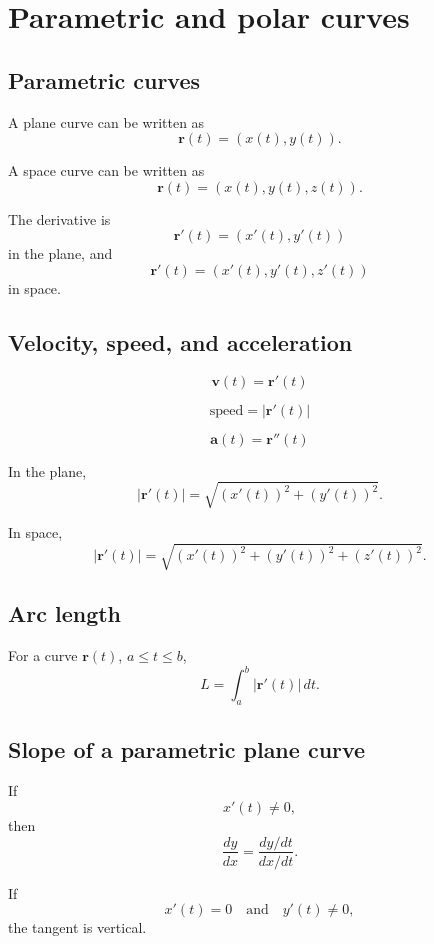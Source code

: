 \section{Parametric and polar curves}
\label{app:A.5}

\subsection*{Parametric curves}

A plane curve can be written as
\[
\boxed{
    \mathbf r(t)=(x(t),y(t)).
}
\]

A space curve can be written as
\[
\boxed{
    \mathbf r(t)=(x(t),y(t),z(t)).
}
\]

The derivative is
\[
\boxed{
    \mathbf r'(t)=(x'(t),y'(t))
}
\]
in the plane, and
\[
\boxed{
    \mathbf r'(t)=(x'(t),y'(t),z'(t))
}
\]
in space.

\subsection*{Velocity, speed, and acceleration}

\[
\boxed{
    \mathbf v(t)=\mathbf r'(t)
}
\]

\[
\boxed{
    \text{speed}=|\mathbf r'(t)|
}
\]

\[
\boxed{
    \mathbf a(t)=\mathbf r''(t)
}
\]

In the plane,
\[
\boxed{
    |\mathbf r'(t)|
    =
    \sqrt{(x'(t))^2+(y'(t))^2}.
}
\]

In space,
\[
\boxed{
    |\mathbf r'(t)|
    =
    \sqrt{(x'(t))^2+(y'(t))^2+(z'(t))^2}.
}
\]

\subsection*{Arc length}

For a curve \(\mathbf r(t)\), \(a\le t\le b\),
\[
\boxed{
    L=\int_a^b |\mathbf r'(t)|\,dt.
}
\]

\subsection*{Slope of a parametric plane curve}

If
\[
    x'(t)\ne0,
\]
then
\[
\boxed{
    \frac{dy}{dx}
    =
    \frac{dy/dt}{dx/dt}.
}
\]

If
\[
    x'(t)=0
    \quad\text{and}\quad
    y'(t)\ne0,
\]
the tangent is vertical.

